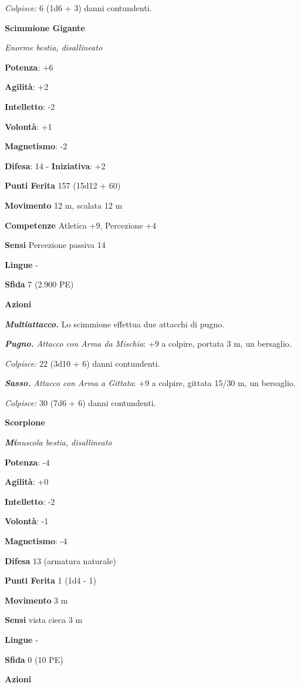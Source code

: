 \begin{multicols}{2}
\emph{Colpisce:} 6 (1d6 + 3) danni contundenti.

\textbf{Scimmione Gigante}

\emph{Enorme bestia, disallineato}

\textbf{Potenza}: +6

\textbf{Agilità}: +2

\textbf{Intelletto}: -2

\textbf{Volontà}: +1

\textbf{Magnetismo}: -2

\textbf{Difesa}: 14 - \textbf{Iniziativa}: +2

\textbf{Punti Ferita} 157 (15d12 + 60)

\textbf{Movimento} 12 m, scalata 12 m

\textbf{Competenze} Atletica +9, Percezione +4

\textbf{Sensi} Percezione passiva 14

\textbf{Lingue} -

\textbf{Sfida} 7 (2.900 PE)

\textbf{Azioni}

\emph{\textbf{Multiattacco.}} Lo scimmione effettua due attacchi di
pugno.

\emph{\textbf{Pugno.} Attacco con Arma da Mischia}: +9 a colpire,
portata 3 m, un bersaglio.

\emph{Colpisce:} 22 (3d10 + 6) danni contundenti.

\emph{\textbf{Sasso.} Attacco con Arma a Gittata}: +9 a colpire, gittata
15/30 m, un bersaglio.

\emph{Colpisce:} 30 (7d6 + 6) danni contundenti.

\textbf{Scorpione}

\emph{\textbf{Mi}nuscola bestia, disallineato}

\textbf{Potenza}: -4

\textbf{Agilità}: +0

\textbf{Intelletto}: -2

\textbf{Volontà}: -1

\textbf{Magnetismo}: -4

\textbf{Difesa} 13 (armatura naturale)

\textbf{Punti Ferita} 1 (1d4 - 1)

\textbf{Movimento} 3 m

\textbf{Sensi} vista cieca 3 m

\textbf{Lingue} -

\textbf{Sfida} 0 (10 PE)

\textbf{Azioni}


\end{multicols}
